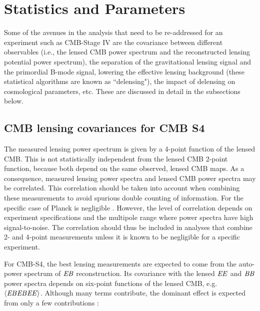 \section{Statistics and Parameters}

Some of the avenues in the analysis that need to be re-addressed for an experiment such as CMB-Stage IV are the covariance between different observables (i.e., the lensed CMB power spectrum and the reconstructed lensing potential power spectrum), the separation of the gravitational lensing signal and the primordial B-mode signal, lowering the effective lensing background (these statistical algorithms are known as ``delensing"), the impact of delensing on cosmological parameters, etc.
These are discussed in detail in the subsections below.

\subsection{CMB lensing covariances for CMB S4}
\label{se:covs}

The measured lensing power spectrum is given by a 4-point function of the lensed CMB.  This is not statistically independent from the lensed CMB 2-point function, because both depend on the same observed, lensed CMB maps.  As a consequence, measured lensing power spectra and lensed CMB power spectra may be correlated.  This correlation should be taken into account when combining these measurements to avoid spurious double counting of information.  For the specific case of Planck is negligible  \cite{marcel1308}.  However, the level of correlation depends on experiment specifications and the multipole range where power spectra have high signal-to-noise.  The correlation should thus be included in analyses that combine 2- and 4-point measurements unless it is known to be negligible for a specific experiment. 

For CMB-S4, the best lensing measurements are expected to come from the auto-power spectrum of $\mathit{EB}$ reconstruction.  Its covariance with the lensed $\mathit{EE}$ and $\mathit{BB}$ power spectra depends on six-point functions of the lensed CMB, e.g.~$\langle \mathit{EB}\mathit{EB}\mathit{EE} \rangle$. Although many terms contribute, the dominant effect is expected from only a few contributions \cite{marcel1308}:  

